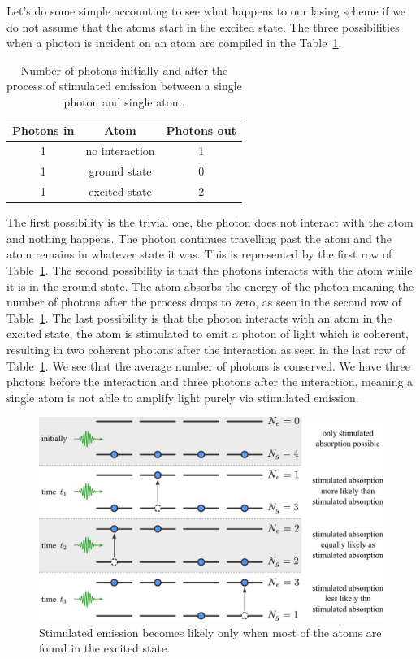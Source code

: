 Let's do some simple accounting to see what happens to our lasing scheme if we do not assume that the atoms start in the excited state.
The three possibilities when a photon is incident on an atom are compiled in the Table~\ref{tab:5-3_three_possibilities}.
\begin{table}[h]
    \centering
    \begin{tabular}{c|c|c}
        Photons in & Atom & Photons out \\
        \hline
        1 & no interaction & 1 \\
        \hline
        1 & ground state & 0 \\
        1 & excited state & 2 \\
    \end{tabular}
    \caption[Stimulated emission accounting]{Number of photons initially and after the process of stimulated emission between a single photon and single atom.}
    \label{tab:5-3_three_possibilities}
\end{table}
The first possibility is the trivial one, the photon does not interact with the atom and nothing happens.
The photon continues travelling past the atom and the atom remains in whatever state it was.
This is represented by the first row of Table~\ref{tab:5-3_three_possibilities}.
The second possibility is that the photons interacts with the atom while it is in the ground state.
The atom absorbs the energy of the photon meaning the number of photons after the process drops to zero, as seen in the second row of Table~\ref{tab:5-3_three_possibilities}.
The last possibility is that the photon interacts with an atom in the excited state, the atom is stimulated to emit a photon of light which is coherent, resulting in two coherent photons after the interaction as seen in the last row of Table~\ref{tab:5-3_three_possibilities}.
We see that the average number of photons is conserved.
We have three photons before the interaction and three photons after the interaction, meaning a single atom is not able to amplify light purely via stimulated emission.

\begin{figure}[t]
    \centering
    \includegraphics[width=\textwidth]{lesson5/5-3_population_inversion.pdf}
    \caption[Population inversion]{Stimulated emission becomes likely only when most of the atoms are found in the excited state.}
    \label{fig:5-3_population_inversion}
\end{figure}

